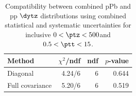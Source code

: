 \begin{table}[htp!]
\centering
\begin{tabular}{|l|r|r|r|}
\hline
Method & $\chi^2$/ndf & ndf & $p$-value \\
\hline
Diagonal & 4.24/6 & 6 & 0.644 \\
Full covariance & 5.20/6 & 6 & 0.519 \\
\hline
\end{tabular}
\caption{Compatibility between combined pPb and pp $\dytz$ distributions using combined statistical and systematic uncertainties for inclusive $0 < \ptz < 500$\GeV and $0.5 < \ptt < 15$\GeV.}
\label{table:chisq_deta}
\end{table}
